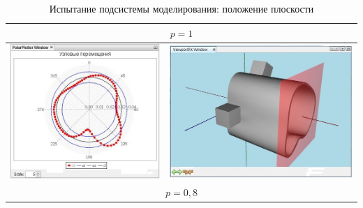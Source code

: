 \documentclass[14pt,oneside,final]{extreport}
\begin{document}
	\begin{table}[]
		\centering
		\caption{Испытание подсистемы моделирования: положение плоскости}
		\label{tab:modeling-plane-tests}{
			{\tabulinesep=1.2mm
				\begin{tabu}[]{|c|c|}
					\hline
					 \\ \hline
					\includegraphics[scale=0.55]{img/plane-position-test1} & \includegraphics[scale=0.55]{img/plane-position-test1-model}  \\ 
					\hline
					 \\ \hline

\end{tabu}}}
\end{table}
\end{document}
